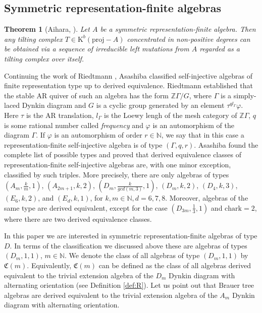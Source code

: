 \documentclass[12pt]{amsart}
\theoremstyle{plain}
\newtheorem{theorem}{Theorem}%
\theoremstyle{remark}
\theoremstyle{definition}
\def\N{\mathbb N} \def\Z{\mathbb Z}
\newcommand{\proj}{{\mathrm{proj}}}
\newcommand{\K}{{\mathrm{K}}}
\newcommand{\charr}{{\mathrm{char}}}
\def\kk{\mathrm{k}}
\begin{document}
\subsection{Symmetric representation-finite algebras}

\begin{theorem}[Aihara, \cite{Aih}]\label{thm:tiltconn} Let $A$ be a symmetric representation-finite algebra. Then any tilting complex $T \in \K^b(\proj-A)$ concentrated in non-positive degrees can be obtained via a sequence of irreducible left mutations from $A$ regarded as a tilting complex over itself. 
\end{theorem}

Continuing the work of Riedtmann \cite{Ried2}, Asashiba \cite{A} classified self-injective algebras of finite representation type up to derived equivalence. Riedtmann established that the stable AR quiver of such an algebra has the form $\Z \Gamma/G$, where $\Gamma$ is a simply-laced Dynkin diagram and $G$ is a cyclic group generated by an element $\tau^{ql_{\Gamma}}\varphi$. Here $\tau$ is the AR translation, $l_\Gamma$ is the Loewy lengh of the mesh category of $\Z\Gamma$, $q$ is some rational number called {\it frequency} and $\varphi$ is an automorphism of the diagram $\Gamma$. If $\varphi$ is an automorphism of order $r \in \N$, we say that in this case a representation-finite self-injective algebra is of type $(\Gamma, q, r)$. Asashiba found the complete list of possible types and proved that derived equivalence classes of representation-finite self-injective algebras are, with one minor exception, classified by such triples. More precisely, there are only algebras of types $(A_m, \frac{k}{m}, 1)$, $(A_{2m+1}, k, 2)$, $(D_m, \frac{k}{gcd(m,3)}, 1)$, $(D_m, k, 2) $, $(D_4, k, 3)$, $(E_6, k, 2)$, and $(E_d, k, 1)$, for ${k,m \in \N, d = 6,7,8}$. Moreover, algebras of the same type are derived equivalent, except for the case $(D_{3m}, \frac{1}{3}, 1)$ and $\charr \kk = 2$, where there are two derived equivalence classes.


In this paper we are interested in symmetric representation-finite algebras of type $D$. In terms of the classification we discussed above these are algebras of types $(D_m, 1, 1)$, $m \in \N$.  We denote the class of all algebras of type $(D_m, 1, 1)$ by $\mathfrak{C}(m)$. Equivalently, $\mathfrak{C}(m)$ can be defined as the class of all algebras derived equivalent to the trivial extension algebra of the $D_m$ Dynkin diagram with alternating orientation (see Definition \ref{def:R}). Let us point out that Brauer tree algebras are derived equivalent to the trivial extension algebra of the $A_m$ Dynkin diagram with alternating orientation.
\end{document}
